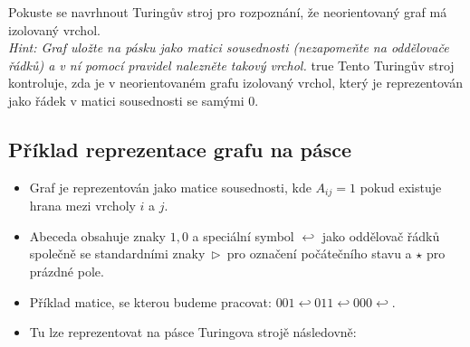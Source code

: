 \documentclass[10pt, a4paper]{ReportSheet}
\begin{document}
\begin{uloha}{10}{2}
    \end{uloha}

    \begin{uloha}{11}{2}{
        Pokuste se navrhnout Turingův stroj pro rozpoznání, že neorientovaný graf má izolovaný vrchol.\\
        \textit{Hint: Graf uložte na pásku jako matici sousednosti (nezapomeňte na oddělovače řádků) a v ní pomocí pravidel nalezněte takový vrchol.}
    }{true}
        Tento Turingův stroj kontroluje, zda je v neorientovaném grafu izolovaný vrchol, který je reprezentován jako řádek v matici sousednosti se samými $0$.

        \subsection*{Příklad reprezentace grafu na pásce}
        \begin{itemize}
            \item Graf je reprezentován jako matice sousednosti, kde $A_{ij} = 1$ pokud existuje hrana mezi vrcholy $i$ a $j$.
            \item Abeceda obsahuje znaky $1, 0$ a speciální symbol $\hookleftarrow$ jako oddělovač řádků společně se standardními
            znaky~$\triangleright$~pro označení počátečního stavu a $\star$ pro prázdné pole.
            \item Příklad matice, se kterou budeme pracovat: $001 \hookleftarrow 011 \hookleftarrow 000 \hookleftarrow$.
            \item Tu lze reprezentovat na pásce Turingova strojě následovně:
        \end{itemize}


        \begin{figure}[H]
            \centering
\end{figure}
\end{uloha}
\end{document}
